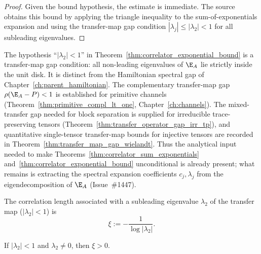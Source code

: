\begin{proof}
    \leanok
    Given the bound hypothesis, the estimate is immediate.
    The source~\cite[Section~II.B.3]{Cirac2021Matrix} obtains this bound
    by applying the triangle inequality to the sum-of-exponentials
    expansion and using the transfer-map gap condition
    $|\lambda_j|\le|\lambda_2|<1$ for all subleading eigenvalues.
\end{proof}

\begin{remark}%
    \label{rem:spectral_hypothesis}
    The hypothesis ``$|\lambda_2| < 1$'' in
    Theorem~\ref{thm:correlator_exponential_bound} is a transfer-map gap
    condition: all non-leading eigenvalues of $\E_A$ lie strictly inside the
    unit disk. It is distinct from the Hamiltonian spectral gap of
    Chapter~\ref{ch:parent_hamiltonian}.
    The complementary transfer-map gap $\rho(\E_A - P) < 1$ is established for
    primitive channels
    (Theorem~\ref{thm:primitive_compl_lt_one}, Chapter~\ref{ch:channels}).
    The mixed-transfer gap needed for block separation is supplied for
    irreducible trace-preserving tensors
    (Theorem~\ref{thm:transfer_operator_gap_irr_tp}), and quantitative single-tensor
    transfer-map bounds for injective tensors are recorded in
    Theorem~\ref{thm:transfer_map_gap_wielandt}.
    Thus the analytical input needed to make
    Theorems~\ref{thm:correlator_sum_exponentials}
    and~\ref{thm:correlator_exponential_bound} unconditional is already
    present; what remains is extracting the spectral expansion coefficients
    $c_j,\lambda_j$ from the eigendecomposition of $\E_A$
    (Issue~\#1447).
\end{remark}

\begin{definition}\label{def:correlation_length}
    \leanok
    The correlation length associated with a subleading eigenvalue
    $\lambda_2$ of the transfer map ($|\lambda_2|<1$) is
    \[
        \xi := -\frac{1}{\log|\lambda_2|}.
    \]
\end{definition}

\begin{lemma}\label{lem:correlation_length_pos}
    \leanok
    If $|\lambda_2| < 1$ and $\lambda_2 \ne 0$, then $\xi > 0$.
\end{lemma}

